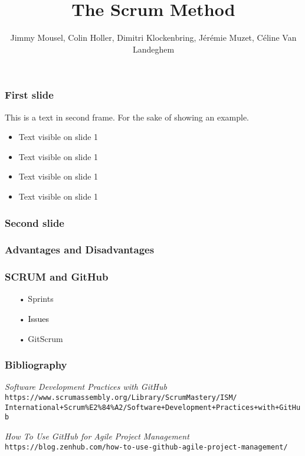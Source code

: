 \documentclass{beamer}
\title{The Scrum Method}
\author{Jimmy Mousel, Colin Holler, Dimitri Klockenbring, Jérémie Muzet, Céline Van Landeghem}
\date{}
\begin{document}
\frame{\titlepage}


\begin{frame}
    \frametitle{First slide}
    
    This is a text in second frame. 
    For the sake of showing an example.
    
    \begin{itemize}
     \item<1-> Text visible on slide 1
     \item<2-> Text visible on slide 1
     \item<3> Text visible on slide 1
     \item<4-> Text visible on slide 1
    \end{itemize}
    
\end{frame}

\begin{frame}
    \frametitle{Second slide}
    
\end{frame}

\begin{frame}
    \frametitle{Advantages and Disadvantages}

    
\end{frame}

\begin{frame}
    \frametitle{SCRUM and GitHub}
 
    \begin{itemize}
    \color{gray}
    \item[•] Sprints
    \item[•] \textcolor{black}{Issues}
    \item[•] GitScrum
    \end{itemize}
    
    
\end{frame}

\begin{frame}
    \frametitle{Bibliography}

	\begin{thebibliography}{10}
	
	\textit{Software Development Practices with GitHub} \\
	\texttt{https://www.scrumassembly.org/Library/ScrumMastery/ISM/\\
	International+Scrum\%E2\%84\%A2/Software+Development+Practices+with+GitHub}
	
	\textit{How To Use GitHub for Agile Project Management} \\
	\texttt{https://blog.zenhub.com/how-to-use-github-agile-project-management/}

	\end{thebibliography}
    
    
\end{frame}
\end{document}
